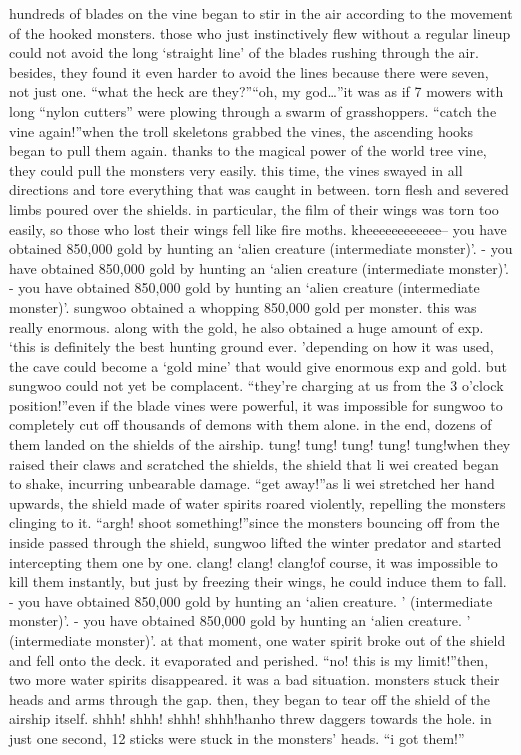 hundreds of blades on the vine began to stir in the air according to the movement of the hooked monsters.
 those who just instinctively flew without a regular lineup could not avoid the long ‘straight line’ of the blades rushing through the air.
 besides, they found it even harder to avoid the lines because there were seven, not just one.
“what the heck are they?”“oh, my god…”it was as if 7 mowers with long “nylon cutters” were plowing through a swarm of grasshoppers.
“catch the vine again!”when the troll skeletons grabbed the vines, the ascending hooks began to pull them again.
 thanks to the magical power of the world tree vine, they could pull the monsters very easily.
this time, the vines swayed in all directions and tore everything that was caught in between.
torn flesh and severed limbs poured over the shields.
 in particular, the film of their wings was torn too easily, so those who lost their wings fell like fire moths.
kheeeeeeeeeeee-- you have obtained 850,000 gold by hunting an ‘alien creature (intermediate monster)’.
- you have obtained 850,000 gold by hunting an ‘alien creature (intermediate monster)’.
- you have obtained 850,000 gold by hunting an ‘alien creature (intermediate monster)’.
sungwoo obtained a whopping 850,000 gold per monster.
 this was really enormous.
along with the gold, he also obtained a huge amount of exp.
‘this is definitely the best hunting ground ever.
’depending on how it was used, the cave could become a ‘gold mine’ that would give enormous exp and gold.
but sungwoo could not yet be complacent.
“they’re charging at us from the 3 o’clock position!”even if the blade vines were powerful, it was impossible for sungwoo to completely cut off thousands of demons with them alone.
 in the end, dozens of them landed on the shields of the airship.
tung! tung! tung! tung! tung!when they raised their claws and scratched the shields, the shield that li wei created began to shake, incurring unbearable damage.
“get away!”as li wei stretched her hand upwards, the shield made of water spirits roared violently, repelling the monsters clinging to it.
“argh! shoot something!”since the monsters bouncing off from the inside passed through the shield, sungwoo lifted the winter predator and started intercepting them one by one.
clang! clang! clang!of course, it was impossible to kill them instantly, but just by freezing their wings, he could induce them to fall.
- you have obtained 850,000 gold by hunting an ‘alien creature.
’ (intermediate monster)’.
- you have obtained 850,000 gold by hunting an ‘alien creature.
’ (intermediate monster)’.
at that moment, one water spirit broke out of the shield and fell onto the deck.
 it evaporated and perished.
“no! this is my limit!”then, two more water spirits disappeared.
 it was a bad situation.
monsters stuck their heads and arms through the gap.
 then, they began to tear off the shield of the airship itself.
shhh! shhh! shhh! shhh!hanho threw daggers towards the hole.
 in just one second, 12 sticks were stuck in the monsters’ heads.
“i got them!”

